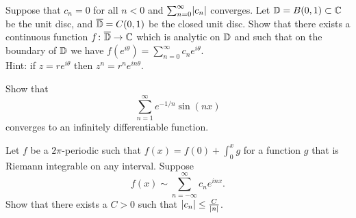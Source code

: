 \begin{exercise}
Suppose that $c_n = 0$ for all $n < 0$ and $\sum_{n=0}^\infty \lvert {c_n} \rvert$
converges.  Let ${\mathbb{D}} = B(0,1) \subset {\mathbb{C}}$ be the unit disc,
and $\overline{{\mathbb{D}}} = C(0,1)$ be the closed unit disc.
Show that there exists a continuous function
$f \colon \overline{{\mathbb{D}}} \to {\mathbb{C}}$ which is analytic on ${\mathbb{D}}$
and such that on the boundary of ${\mathbb{D}}$ we have
$f(e^{i\theta}) = \sum_{n=0}^\infty c_n e^{i\theta}$.\\
Hint: if $z=re^{i\theta}$ then $z^n = r^n e^{in\theta}$.
\end{exercise}

\begin{exercise}
Show that
\begin{equation*}
\sum_{n=1}^\infty e^{-1/n} \sin(n x)
\end{equation*}
converges to an infinitely differentiable function.
\end{exercise}

\begin{exercise}
Let $f$ be a $2\pi$-periodic such that $f(x) = f(0) + \int_0^x g$
for a function $g$ that is Riemann integrable on any interval.
Suppose
\begin{equation*}
f(x) \sim
\sum_{n=-\infty}^\infty c_n e^{inx} .
\end{equation*}
Show that there exists a $C > 0$ such that
$\lvert {c_n} \rvert \leq \frac{C}{\lvert {n} \rvert}$.
\end{exercise}
